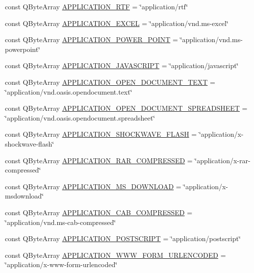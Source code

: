 \begin{DoxyCompactItemize}
\item 
const Q\+Byte\+Array \hyperlink{namespace_h_t_t_p_ab5fe954161608a8f416d20e4aac9de4e}{A\+P\+P\+L\+I\+C\+A\+T\+I\+O\+N\+\_\+\+R\+TF} = \char`\"{}application/rtf\char`\"{}
\item 
const Q\+Byte\+Array \hyperlink{namespace_h_t_t_p_ace7549037793b690bd7dba3d8561e795}{A\+P\+P\+L\+I\+C\+A\+T\+I\+O\+N\+\_\+\+E\+X\+C\+EL} = \char`\"{}application/vnd.\+ms-\/excel\char`\"{}
\item 
const Q\+Byte\+Array \hyperlink{namespace_h_t_t_p_aeb01f488b9298dbd1243a3458ac4c6d2}{A\+P\+P\+L\+I\+C\+A\+T\+I\+O\+N\+\_\+\+P\+O\+W\+E\+R\+\_\+\+P\+O\+I\+NT} = \char`\"{}application/vnd.\+ms-\/powerpoint\char`\"{}
\item 
const Q\+Byte\+Array \hyperlink{namespace_h_t_t_p_a35c4ceba46f7295a2ca1726f980ba577}{A\+P\+P\+L\+I\+C\+A\+T\+I\+O\+N\+\_\+\+J\+A\+V\+A\+S\+C\+R\+I\+PT} = \char`\"{}application/javascript\char`\"{}
\item 
const Q\+Byte\+Array \hyperlink{namespace_h_t_t_p_a0da048c4359bd71986f59eda93cefbcc}{A\+P\+P\+L\+I\+C\+A\+T\+I\+O\+N\+\_\+\+O\+P\+E\+N\+\_\+\+D\+O\+C\+U\+M\+E\+N\+T\+\_\+\+T\+E\+XT} = \char`\"{}application/vnd.\+oasis.\+opendocument.\+text\char`\"{}
\item 
const Q\+Byte\+Array \hyperlink{namespace_h_t_t_p_a9bcba4c5c2c9a17b7f80d93a4e3afed5}{A\+P\+P\+L\+I\+C\+A\+T\+I\+O\+N\+\_\+\+O\+P\+E\+N\+\_\+\+D\+O\+C\+U\+M\+E\+N\+T\+\_\+\+S\+P\+R\+E\+A\+D\+S\+H\+E\+ET} = \char`\"{}application/vnd.\+oasis.\+opendocument.\+spreadsheet\char`\"{}
\item 
const Q\+Byte\+Array \hyperlink{namespace_h_t_t_p_a23d3acc4733940a1878494ec765f8019}{A\+P\+P\+L\+I\+C\+A\+T\+I\+O\+N\+\_\+\+S\+H\+O\+C\+K\+W\+A\+V\+E\+\_\+\+F\+L\+A\+SH} = \char`\"{}application/x-\/shockwave-\/flash\char`\"{}
\item 
const Q\+Byte\+Array \hyperlink{namespace_h_t_t_p_a49896da76444860203d16382146384e4}{A\+P\+P\+L\+I\+C\+A\+T\+I\+O\+N\+\_\+\+R\+A\+R\+\_\+\+C\+O\+M\+P\+R\+E\+S\+S\+ED} = \char`\"{}application/x-\/rar-\/compressed\char`\"{}
\item 
const Q\+Byte\+Array \hyperlink{namespace_h_t_t_p_aa5e802cd17be2f045f128f3e5b31c001}{A\+P\+P\+L\+I\+C\+A\+T\+I\+O\+N\+\_\+\+M\+S\+\_\+\+D\+O\+W\+N\+L\+O\+AD} = \char`\"{}application/x-\/msdownload\char`\"{}
\item 
const Q\+Byte\+Array \hyperlink{namespace_h_t_t_p_a85158a6f753e6b31547d2f1cb235d50f}{A\+P\+P\+L\+I\+C\+A\+T\+I\+O\+N\+\_\+\+C\+A\+B\+\_\+\+C\+O\+M\+P\+R\+E\+S\+S\+ED} = \char`\"{}application/vnd.\+ms-\/cab-\/compressed\char`\"{}
\item 
const Q\+Byte\+Array \hyperlink{namespace_h_t_t_p_ad9673dfd29bbccd09c52d9566579bb4c}{A\+P\+P\+L\+I\+C\+A\+T\+I\+O\+N\+\_\+\+P\+O\+S\+T\+S\+C\+R\+I\+PT} = \char`\"{}application/postscript\char`\"{}
\item 
const Q\+Byte\+Array \hyperlink{namespace_h_t_t_p_a17e85427edfbc61d9f580d0ba7741884}{A\+P\+P\+L\+I\+C\+A\+T\+I\+O\+N\+\_\+\+W\+W\+W\+\_\+\+F\+O\+R\+M\+\_\+\+U\+R\+L\+E\+N\+C\+O\+D\+ED} = \char`\"{}application/x-\/www-\/form-\/urlencoded\char`\"{}
\end{DoxyCompactItemize}


